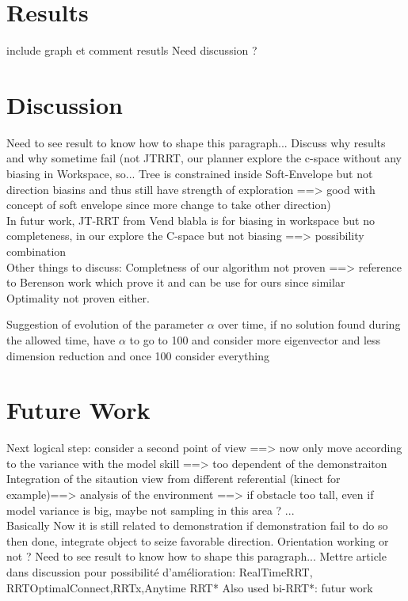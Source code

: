 \documentclass[letterpaper, 10 pt, conference]{ieeeconf}  %
\begin{document}
\section{Results}
include graph et comment resutls 
Need discussion ? 
\section{Discussion}
  Need to see result to know how to shape this paragraph...
Discuss why results and why sometime fail (not JTRRT, our planner explore the c-space without any biasing in Workspace, so... Tree is constrained inside Soft-Envelope but not direction biasins and thus still have strength of exploration ==> good with concept of soft envelope since more change to take other direction)\\

In futur work, JT-RRT from Vend blabla is for biasing in workspace but no completeness, in our explore the C-space but not biasing ==> possibility combination\\

Other things to discuss: Completness of our algorithm not proven ==> reference to Berenson work which prove it and can be use for ours since similar\\

Optimality not proven either.

Suggestion of evolution of the parameter $\alpha$ over time, if no solution found during the allowed time, have $\alpha$ to go to 100 and consider more eigenvector and less dimension reduction and once 100 consider everything \\

\section{Future Work}
Next logical step: consider a second point of view ==> now only move according to the variance with the model skill ==> too dependent of the demonstraiton
Integration of the sitaution view from different referential (kinect for example)==> analysis of the environment ==> if obstacle too tall, even if model variance is big, maybe not sampling in this area ? ... \\
Basically Now it is still related to demonstration if demonstration fail to do so then done, integrate object to seize favorable direction.
Orientation working or not ?  Need to see result to know how to shape this paragraph...
Mettre article dans discussion pour possibilité d'amélioration:
RealTimeRRT, RRTOptimalConnect,RRTx,Anytime RRT*
Also used bi-RRT*: futur work
\end{document}
